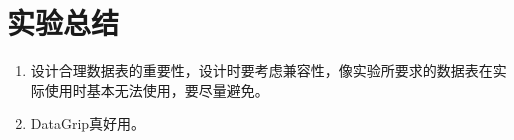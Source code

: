 \documentclass[a4paper,UTF8,heading=false,12pt]{article}
\begin{document}
    \section{实验总结}

    \begin{enumerate}
        \item 设计合理数据表的重要性，设计时要考虑兼容性，像实验所要求的数据表在实际使用时基本无法使用，要尽量避免。
        \item DataGrip真好用。
    \end{enumerate}
\end{document}
